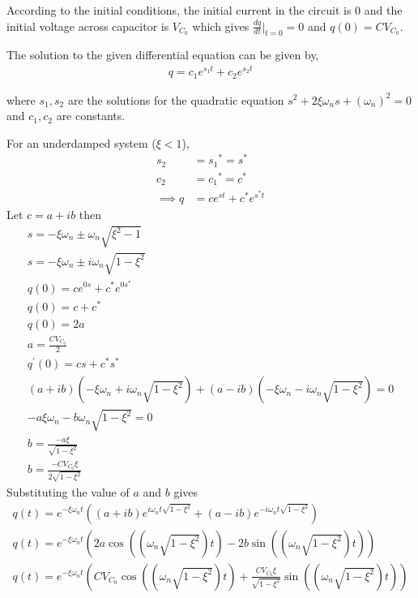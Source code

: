 \documentclass[12pt]{article}
\providecommand{\brak}[1]{\ensuremath{\left(#1\right)}}
\begin{document}
According to the initial conditions, the initial current in the circuit is 0 and the initial voltage across capacitor is $V_{C_0}$ which gives $\frac{dq}{dt}\Bigr|_{t=0} = 0 $ and $q(0) = CV_{C_0}$.

The solution to the given differential equation can be given by,
\begin{align*}
    q = c_1e^{s_1 t} + {c_2} e^{s_2 t}
\end{align*}

where $s_1, s_2$ are the solutions for the quadratic equation $s^2 + 2\xi\omega_{n}s + \brak{\omega_{n}}^2 = 0$ and $c_1, c_2$ are constants.

For an underdamped system ($\xi < 1$),
\begin{align*}
    s_2 &= {s_1}^{\ast} = s^{\ast}\\
    c_2 &= {c_1}^{\ast} = c^{\ast}\\
    \implies q &= ce^{st} + c^{\ast}e^{s^{\ast}t}
\end{align*}
Let $c = a+ib$ then
\begin{align*}
  s = -\xi\omega_n \pm \omega_n\sqrt{\xi^2-1}\\
  s = -\xi\omega_n \pm i\omega_n\sqrt{1-\xi^2}\\
  q\brak{0} = ce^{0s} + c^{\ast}e^{0s^{\ast}}\\
  q\brak{0} = c + c^{\ast}\\
  q\brak{0} = 2a\\
  a = \frac{CV_{C_0}}{2}\\
  q^{\prime}\brak{0} = cs + c^{\ast}s^{\ast}\\
  \brak{a+ib}\brak{-\xi\omega_n + i\omega_n\sqrt{1-\xi^2}} + \brak{a-ib}\brak{-\xi\omega_n - i\omega_n\sqrt{1-\xi^2}} = 0\\
  -a\xi\omega_n - b\omega_n\sqrt{1-\xi^2} = 0\\
  b = \frac{-a\xi}{\sqrt{1-\xi^2}}\\
  b = \frac{-CV_{C_0}\xi}{2\sqrt{1-\xi^2}}
\end{align*}
Substituting the value of $a$ and $b$ gives
\begin{align*}
  q\brak{t} = e^{-\xi\omega_n t}\brak{\brak{a+ib}e^{i\omega_n t\sqrt{1-\xi^2}} + \brak{a-ib}e^{-i\omega_n t\sqrt{1-\xi^2}}}\\
  q\brak{t} = e^{-\xi\omega_n t}\brak{2a\cos\brak{\brak{\omega_n\sqrt{1-\xi^2}}t} - 2b\sin\brak{\brak{\omega_n\sqrt{1-\xi^2}}t}}\\
  q\brak{t} = e^{-\xi\omega_n t}\brak{CV_{C_0}\cos\brak{\brak{\omega_n\sqrt{1-\xi^2}}t} + \frac{CV_{C_0}\xi}{\sqrt{1-\xi^2}}\sin\brak{\brak{\omega_n\sqrt{1-\xi^2}}t}}\\
 \end{align*}
\end{document}
